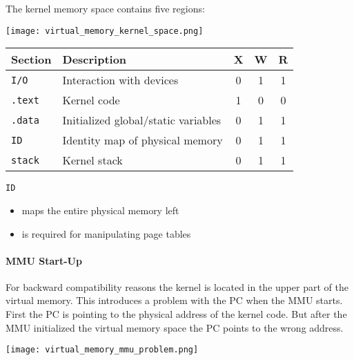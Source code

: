 The kernel memory space contains five regions:

\begin{center}
    \texttt{[image: virtual\_memory\_kernel\_space.png]}
\end{center}

\renewcommand{\arraystretch}{1.3}
\setlength{\oldtabcolsep}{\tabcolsep}\setlength\tabcolsep{6pt}

\begin{tabularx}{\linewidth}{@{}lXccc@{}}
    Section        & Description                         & X & W & R \\
    \midrule
    \texttt{I/O}   & Interaction with devices            & 0 & 1 & 1 \\
    \texttt{.text} & Kernel code                         & 1 & 0 & 0 \\
    \texttt{.data} & Initialized global/static variables & 0 & 1 & 1 \\
    \texttt{ID}    & Identity map of physical memory     & 0 & 1 & 1 \\
    \texttt{stack} & Kernel stack                        & 0 & 1 & 1
\end{tabularx}

\newpar{}

\texttt{ID}
\begin{itemize}
    \item maps the entire physical memory left
    \item is required for manipulating page tables
\end{itemize}

\renewcommand{\arraystretch}{1}
\setlength\tabcolsep{\oldtabcolsep}

\paragraph{MMU Start-Up}

For backward compatibility reasons the kernel is located in the upper part of the virtual memory. This introduces a problem with the PC when the MMU starts. First the PC is pointing to the physical address of the kernel code. But after the MMU initialized the virtual memory space the PC points to the wrong address.

\begin{center}
    \texttt{[image: virtual\_memory\_mmu\_problem.png]}
\end{center}

